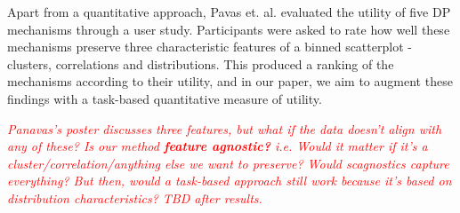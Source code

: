 \documentclass[journal]{vgtc}                     %
\begin{document}
Apart from a quantitative approach, Pavas et. al. \cite{Panavas2022} evaluated the utility of five DP mechanisms through a user study. Participants were asked to rate how well these mechanisms preserve three characteristic features of a binned scatterplot - clusters, correlations and distributions. This produced a ranking of the mechanisms according to their utility, and in our paper, we aim to augment these findings with a task-based quantitative measure of utility.

\textit{\textcolor{red}{Panavas's poster discusses three features, but what if the data doesn't align with any of these? Is our method \textbf{feature agnostic?} i.e. Would it matter if it's 
 a cluster/correlation/anything else we want to preserve? Would scagnostics capture everything? But then, would a task-based approach still work because it's based on distribution characteristics? TBD after results. }}

    
\end{document}
